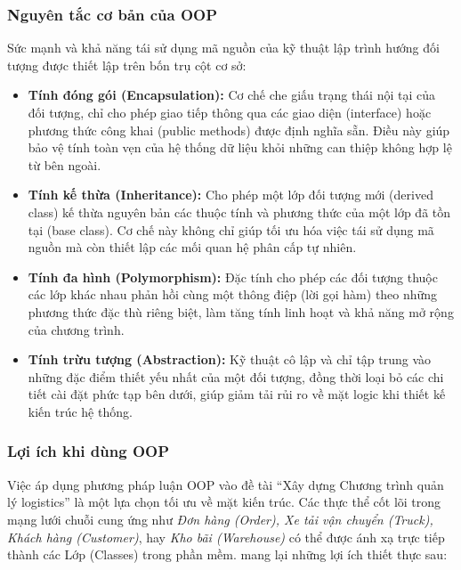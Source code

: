\documentclass[12pt,a4paper]{article}
\begin{document}
\subsubsection{Nguyên tắc cơ bản của OOP}

Sức mạnh và khả năng tái sử dụng mã nguồn của kỹ thuật lập trình hướng đối tượng được thiết lập trên bốn trụ cột cơ sở:

\begin{itemize}[label={\scalebox{1.2}{$\circ$}}, leftmargin=2em]
    \item \textbf{Tính đóng gói (Encapsulation):} Cơ chế che giấu trạng thái nội tại của đối tượng, chỉ cho phép giao tiếp thông qua các giao diện (interface) hoặc phương thức công khai (public methods) được định nghĩa sẵn. Điều này giúp bảo vệ tính toàn vẹn của hệ thống dữ liệu khỏi những can thiệp không hợp lệ từ bên ngoài.
    \item \textbf{Tính kế thừa (Inheritance):} Cho phép một lớp đối tượng mới (derived class) kế thừa nguyên bản các thuộc tính và phương thức của một lớp đã tồn tại (base class). Cơ chế này không chỉ giúp tối ưu hóa việc tái sử dụng mã nguồn mà còn thiết lập các mối quan hệ phân cấp tự nhiên.
    \item \textbf{Tính đa hình (Polymorphism):} Đặc tính cho phép các đối tượng thuộc các lớp khác nhau phản hồi cùng một thông điệp (lời gọi hàm) theo những phương thức đặc thù riêng biệt, làm tăng tính linh hoạt và khả năng mở rộng của chương trình.
    \item \textbf{Tính trừu tượng (Abstraction):} Kỹ thuật cô lập và chỉ tập trung vào những đặc điểm thiết yếu nhất của một đối tượng, đồng thời loại bỏ các chi tiết cài đặt phức tạp bên dưới, giúp giảm tải rủi ro về mặt logic khi thiết kế kiến trúc hệ thống.
\end{itemize}

\subsubsection{Lợi ích khi dùng OOP}

Việc áp dụng phương pháp luận OOP vào đề tài ``Xây dựng Chương trình quản lý logistics'' là một lựa chọn tối ưu về mặt kiến trúc. Các thực thể cốt lõi trong mạng lưới chuỗi cung ứng như \textit{Đơn hàng (Order), Xe tải vận chuyển (Truck), Khách hàng (Customer)}, hay \textit{Kho bãi (Warehouse)} có thể được ánh xạ trực tiếp thành các Lớp (Classes) trong phần mềm. mang lại những lợi ích thiết thực sau:
\end{document}
